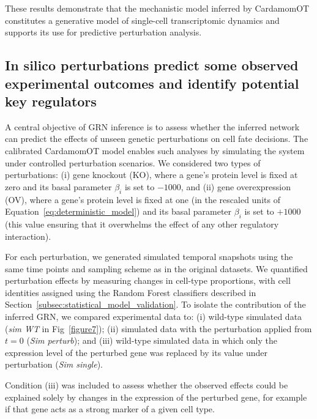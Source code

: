 \documentclass[a4paper, 11pt]{article}
\theoremstyle{plain}
\theoremstyle{remark}
\newcommand*{\firstreview}[1]{{\color{black}#1}}
\begin{document}
These results demonstrate that the mechanistic model inferred by CardamomOT constitutes a generative model of single-cell transcriptomic dynamics and supports its use for predictive perturbation analysis.

\subsection{\texorpdfstring{\firstreview{In silico perturbations predict some observed experimental outcomes and identify potential key regulators}}{In silico perturbations predict some observed experimental outcomes and identify potential key regulators}}
\label{subsec:perturbation_analysis}

A central objective of GRN inference is to assess whether the inferred network can predict the effects of unseen genetic perturbations on cell fate decisions. The calibrated CardamomOT model enables such analyses by simulating the system under controlled perturbation scenarios. We considered two types of perturbations: (i) gene knockout (KO), where a gene's protein level is fixed at zero and its basal parameter $\beta_i$ is set to $-1000$, and (ii) gene overexpression (OV), where a gene's protein level is fixed at one (in the rescaled units of Equation~\eqref{eq:deterministic_model}) and its basal parameter $\beta_i$ is set to $+1000$ (this value ensuring that it overwhelms the effect of any other regulatory interaction).

For each perturbation, we generated simulated temporal snapshots using the same time points and sampling scheme as in the original datasets. We quantified perturbation effects by measuring changes in cell-type proportions, with cell identities assigned using the Random Forest classifiers described in Section~\ref{subsec:statistical_model_validation}. To isolate the contribution of the inferred GRN, we compared experimental data to: (i) wild-type simulated data (\textit{sim WT} in Fig~\ref{figure7}); (ii) simulated data with the perturbation applied from $t = 0$ (\textit{Sim perturb}); and (iii) wild-type simulated data in which only the expression level of the perturbed gene was replaced by its value under perturbation (\textit{Sim single}). 

\firstreview{Condition (iii) was included to assess whether the observed effects could be
explained solely by changes in the expression of the perturbed gene, for example
if that gene acts as a strong marker of a given cell type.}
\end{document}
